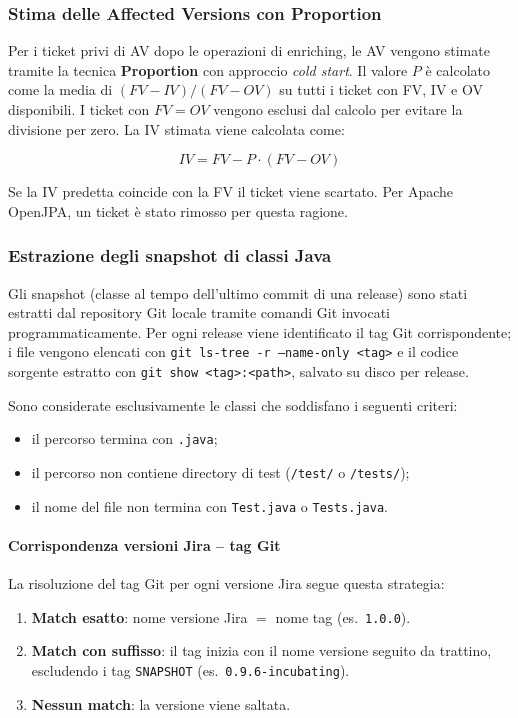 \subsubsection{Stima delle Affected Versions con Proportion}

Per i ticket privi di AV dopo le operazioni di enriching, le AV vengono stimate tramite la
tecnica \textbf{Proportion} con approccio \emph{cold start}. Il valore $P$ è calcolato
come la media di $(FV - IV) / (FV - OV)$ su tutti i ticket con FV, IV e OV disponibili.
I ticket con $FV = OV$ vengono esclusi dal calcolo per evitare la divisione per zero.
La IV stimata viene calcolata come:

\[
IV = FV - P \cdot (FV - OV)
\]

Se la IV predetta coincide con la FV il ticket viene scartato. Per Apache OpenJPA, un
ticket è stato rimosso per questa ragione.

\subsubsection{Estrazione degli snapshot di classi Java}

Gli snapshot (classe al tempo dell'ultimo commit di una release) sono stati estratti dal repository Git locale tramite comandi Git invocati
programmaticamente. Per ogni release viene identificato il tag Git corrispondente;
i file vengono elencati con \texttt{git ls-tree -r --name-only <tag>} e il codice sorgente
estratto con \texttt{git show <tag>:<path>}, salvato su disco per release.

Sono considerate esclusivamente le classi che soddisfano i seguenti criteri:
\begin{itemize}
    \item il percorso termina con \texttt{.java};
    \item il percorso non contiene directory di test (\texttt{/test/} o \texttt{/tests/});
    \item il nome del file non termina con \texttt{Test.java} o \texttt{Tests.java}.
\end{itemize}

\paragraph{Corrispondenza versioni Jira -- tag Git}

La risoluzione del tag Git per ogni versione Jira segue questa strategia:
\begin{enumerate}
    \item \textbf{Match esatto}: nome versione Jira $=$ nome tag (es.\ \texttt{1.0.0}).
    \item \textbf{Match con suffisso}: il tag inizia con il nome versione seguito da
    trattino, escludendo i tag \texttt{SNAPSHOT} (es.\ \texttt{0.9.6-incubating}).
    \item \textbf{Nessun match}: la versione viene saltata.
\end{enumerate}

